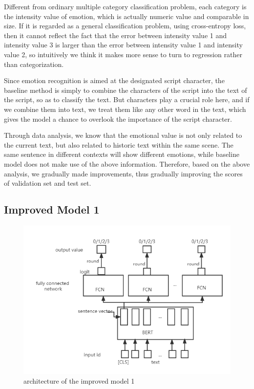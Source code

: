 \documentclass[12pt,twocolumn,letterpaper]{article}
\begin{document}
Different from ordinary multiple category classification problem, each category is the intensity value of emotion, which is actually numeric value and comparable in size. If it is regarded as a general classification problem, using cross-entropy loss, then it cannot reflect the fact that the error between intensity value 1 and intensity value 3 is larger than the error between intensity value 1 and intensity value 2, so intuitively we think it makes more sense to turn to regression rather than categorization.  

Since emotion recognition is aimed at the designated script character, the baseline method is simply to combine the characters of the script into the text of the script, so as to classify the text. But characters play a crucial role here, and if we combine them into text, we treat them like any other word in the text, which gives the model a chance to overlook the importance of the script character.  

Through data analysis, we know that the emotional value is not only related to the current text, but also related to historic text within the same scene. The same sentence in different contexts will show different emotions, while baseline model does not make use of the above information.  
Therefore, based on the above analysis, we gradually made improvements, thus gradually improving the scores of validation set and test set.    


\subsection{Improved Model 1}
\begin{figure}
\begin{center}
\includegraphics[scale=0.5]{Method2.png}
\end{center}
   \caption{architecture of the improved model 1}
\label{fig:short}
\end{figure}
\end{document}
